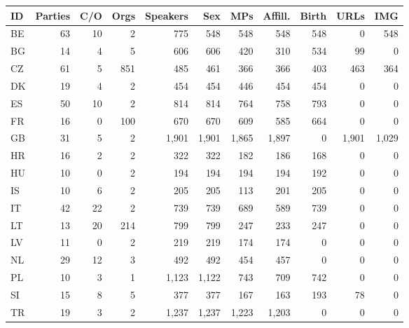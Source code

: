 \begin{tabular}{l|rrr|rrrrrrr}
ID&Parties&C/O&Orgs&Speakers&Sex&MPs&Affill.&Birth&URLs&IMG\\
\hline
BE&63&10&2&775&548&548&548&548&0&548\\
BG&14&4&5&606&606&420&310&534&99&0\\
CZ&61&5&851&485&461&366&366&403&463&364\\
DK&19&4&2&454&454&446&454&454&0&0\\
ES&50&10&2&814&814&764&758&793&0&0\\
FR&16&0&100&670&670&609&585&664&0&0\\
GB&31&5&2&1,901&1,901&1,865&1,897&0&1,901&1,029\\
HR&16&2&2&322&322&182&186&168&0&0\\
HU&10&0&2&194&194&194&194&192&0&0\\
IS&10&6&2&205&205&113&201&205&0&0\\
IT&42&22&2&739&739&689&589&739&0&0\\
LT&13&20&214&799&799&247&233&247&0&0\\
LV&11&0&2&219&219&174&174&0&0&0\\
NL&29&12&3&492&492&454&457&0&0&0\\
PL&10&3&1&1,123&1,122&743&709&742&0&0\\
SI&15&8&5&377&377&167&163&193&78&0\\
TR&19&3&2&1,237&1,237&1,223&1,203&0&0&0\\
\end{tabular}
